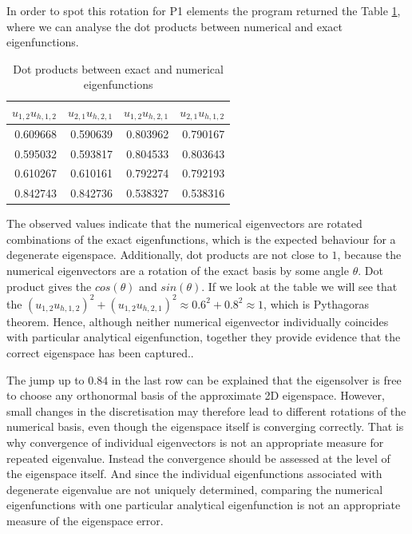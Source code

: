 \documentclass[acmsmall,screen]{MapleTrans}
\begin{document}
In order to spot this rotation for P1 elements the program returned the Table \ref{tab:dot products}, where we can analyse the dot products between numerical and exact eigenfunctions.
\begin{table}[H]
    \centering
    \caption{Dot products between exact and numerical eigenfunctions}
    \label{tab:dot products}
    \begin{tabular}{rrrr}
        \toprule
        $u_{1,2} u_{h,1,2}$ & $u_{2,1} u_{h,2,1}$ & $u_{1,2} u_{h,2,1}$ & $u_{2,1} u_{h,1,2}$ \\
        \midrule
        0.609668 & 0.590639 & 0.803962 & 0.790167 \\
        0.595032 & 0.593817 & 0.804533 & 0.803643 \\
        0.610267 & 0.610161 & 0.792274 & 0.792193 \\
        0.842743 & 0.842736 & 0.538327 & 0.538316 \\
        \bottomrule
    \end{tabular}
\end{table}

The observed values indicate that the numerical eigenvectors are rotated combinations of the exact eigenfunctions, which is the expected behaviour for a degenerate eigenspace.
Additionally, dot products are not close to $1$, because the numerical eigenvectors are a rotation of the exact basis by some angle $\theta$. Dot product gives the $cos(\theta)$ and $sin(\theta)$. If we look at the table we will see that the $(u_{1,2} u_{h,1,2})^2 + (u_{1,2} u_{h,2,1})^2 \approx 0.6^2 + 0.8^2 \approx 1$, which is Pythagoras theorem. Hence, although neither numerical eigenvector individually coincides with particular analytical eigenfunction, together they provide evidence that the correct eigenspace has been captured.. 

The jump up to $0.84$ in the last row can be explained that the eigensolver is free to choose any orthonormal basis of the approximate 2D eigenspace.
However, small changes in the discretisation may therefore lead to different rotations of the numerical basis, even though the eigenspace itself is converging correctly. That is why convergence of individual eigenvectors is not an appropriate measure for repeated eigenvalue. Instead the convergence should be assessed at the level of the eigenspace itself.
And since the individual eigenfunctions associated with degenerate eigenvalue are not uniquely determined, comparing the numerical eigenfunctions with one particular analytical eigenfunction is not an appropriate measure of the eigenspace error.
\end{document}
